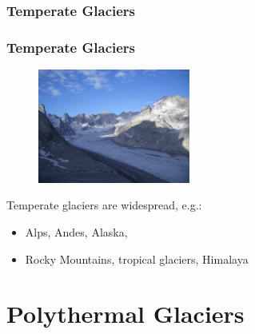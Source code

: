 \documentclass[hide notes,intlimits,handout]{beamer}
\begin{document}
\subsubsection{Temperate Glaciers}

\begin{frame}
  \frametitle{Temperate Glaciers}
  \begin{figure}
    \includegraphics[width=5cm]{figures/forno}
  \end{figure}
  Temperate glaciers are widespread, e.g.:
  \begin{itemize}
  \item Alps, Andes, Alaska,
  \item Rocky Mountains, tropical glaciers, Himalaya
  \end{itemize}
\end{frame}


\section{Polythermal Glaciers}


\end{document}
